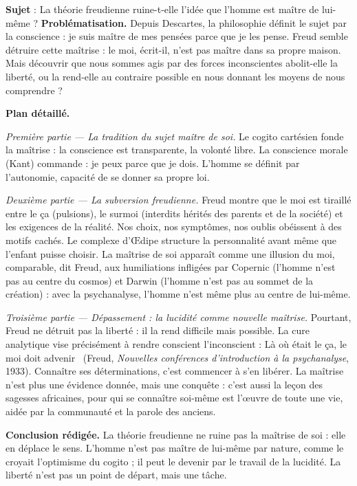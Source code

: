 \documentclass[11pt]{article}
\newcommand{\cle}[1]{{\popxbold\color{popdark}#1}}
\begin{document}
\begin{exoresolu}
\textbf{Sujet} : La théorie freudienne ruine-t-elle l'idée que l'homme est maître de lui-même ?
\tcblower
\textbf{Problématisation.} Depuis Descartes, la philosophie définit le sujet par la conscience : je suis maître de mes pensées parce que je les pense. Freud semble détruire cette maîtrise : le moi, écrit-il, n'est pas maître dans sa propre maison. Mais découvrir que nous sommes agis par des forces inconscientes abolit-elle la liberté, ou la rend-elle au contraire possible en nous donnant les moyens de nous comprendre ?

\textbf{Plan détaillé.}

\emph{Première partie — La tradition du sujet maître de soi.} Le cogito cartésien fonde la maîtrise : la conscience est transparente, la volonté libre. La \cle{conscience morale} (Kant) commande : je peux parce que je dois. L'homme se définit par l'autonomie, capacité de se donner sa propre loi.

\emph{Deuxième partie — La subversion freudienne.} Freud montre que le moi est tiraillé entre le ça (pulsions), le surmoi (interdits hérités des parents et de la société) et les exigences de la réalité. Nos choix, nos symptômes, nos oublis obéissent à des motifs cachés. Le complexe d'Œdipe structure la personnalité avant même que l'enfant puisse choisir. La maîtrise de soi apparaît comme une illusion du moi, comparable, dit Freud, aux humiliations infligées par Copernic (l'homme n'est pas au centre du cosmos) et Darwin (l'homme n'est pas au sommet de la création) : avec la psychanalyse, l'homme n'est même plus au centre de lui-même.

\emph{Troisième partie — Dépassement : la lucidité comme nouvelle maîtrise.} Pourtant, Freud ne détruit pas la liberté : il la rend difficile mais possible. La cure analytique vise précisément à rendre conscient l'inconscient : \guillemotleft Là où était le ça, le moi doit advenir \guillemotright\ (Freud, \emph{Nouvelles conférences d'introduction à la psychanalyse}, 1933). Connaître ses déterminations, c'est commencer à s'en libérer. La maîtrise n'est plus une évidence donnée, mais une conquête : c'est aussi la leçon des sagesses africaines, pour qui se connaître soi-même est l'œuvre de toute une vie, aidée par la communauté et la parole des anciens.

\textbf{Conclusion rédigée.} La théorie freudienne ne ruine pas la maîtrise de soi : elle en déplace le sens. L'homme n'est pas maître de lui-même par nature, comme le croyait l'optimisme du cogito ; il peut le devenir par le travail de la lucidité. La liberté n'est pas un point de départ, mais une tâche.
\end{exoresolu}
\end{document}
